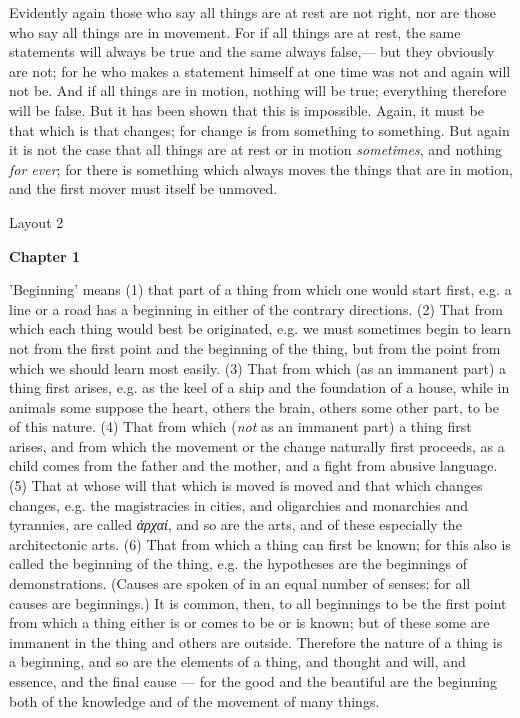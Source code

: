 Evidently again those who say all things are at rest are not right, nor are those who say all things are in movement. For if all things are at rest, the same statements will always be true and the same always false,— but they obviously are not; for he who makes a statement himself at one time was not and again will not be. And if all things are in motion, nothing will be true; everything therefore will be false. But it has been shown that this is impossible. Again, it must be that which is that changes; for change is from something to something. But again it is not the case that all things are at rest or in motion \emph{sometimes}, and nothing \emph{for ever}; for there is something which always moves the things that are in motion, and the first mover must itself be unmoved.


Layout 2

\textbf{Chapter 1}

'Beginning' means (1) that part of a thing from which one would start first, e.g. a line or a road has a beginning in either of the contrary directions. (2) That from which each thing would best be originated, e.g. we must sometimes begin to learn not from the first point and the beginning of the thing, but from the point from which we should learn most easily. (3) That from which (as an immanent part) a thing first arises, e.g. as the keel of a ship and the foundation of a house, while in animals some suppose the heart, others the brain, others some other part, to be of this nature. (4) That from which (\emph{not} as an immanent part) a thing first arises, and from which the movement or the change naturally first proceeds, as a child comes from the father and the mother, and a fight from abusive language. (5) That at whose will that which is moved is moved and that which changes changes, e.g. the magistracies in cities, and oligarchies and monarchies and tyrannies, are called \emph{ἀρχαί}, and so are the arts, and of these especially the architectonic arts. (6) That from which a thing can first be known; for this also is called the beginning of the thing, e.g. the hypotheses are the beginnings of demonstrations. (Causes are spoken of in an equal number of senses; for all causes are beginnings.) It is common, then, to all beginnings to be the first point from which a thing either is or comes to be or is known; but of these some are immanent in the thing and others are outside. Therefore the nature of a thing is a beginning, and so are the elements of a thing, and thought and will, and essence, and the final cause — for the good and the beautiful are the beginning both of the knowledge and of the movement of many things.

